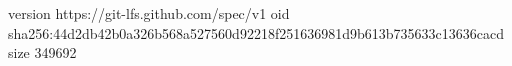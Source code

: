 version https://git-lfs.github.com/spec/v1
oid sha256:44d2db42b0a326b568a527560d92218f251636981d9b613b735633c13636cacd
size 349692
